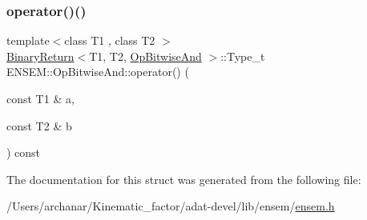 \subsubsection{\texorpdfstring{operator()()}{operator()()}\hspace{0.1cm}{\footnotesize\ttfamily [3/3]}}
{\footnotesize\ttfamily template$<$class T1 , class T2 $>$ \\
\mbox{\hyperlink{structENSEM_1_1BinaryReturn}{Binary\+Return}}$<$T1, T2, \mbox{\hyperlink{structENSEM_1_1OpBitwiseAnd}{Op\+Bitwise\+And}} $>$\+::Type\+\_\+t E\+N\+S\+E\+M\+::\+Op\+Bitwise\+And\+::operator() (\begin{DoxyParamCaption}\item[{const T1 \&}]{a,  }\item[{const T2 \&}]{b }\end{DoxyParamCaption}) const\hspace{0.3cm}{\ttfamily [inline]}}



The documentation for this struct was generated from the following file\+:\begin{DoxyCompactItemize}
\item 
/\+Users/archanar/\+Kinematic\+\_\+factor/adat-\/devel/lib/ensem/\mbox{\hyperlink{adat-devel_2lib_2ensem_2ensem_8h}{ensem.\+h}}\end{DoxyCompactItemize}
